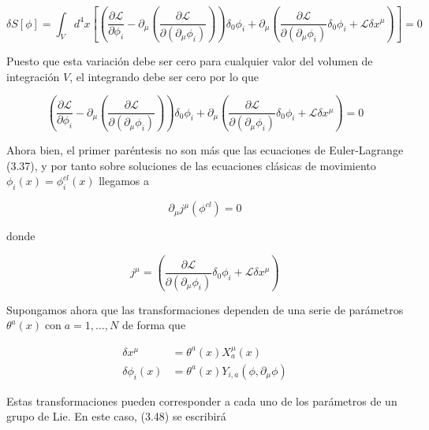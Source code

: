 \begin{equation*}
\delta S[\phi]=\int_{V} d^{4} x\left[\left(\frac{\partial \mathscr{L}}{\partial \phi_{i}}-\partial_{\mu}\left(\frac{\partial \mathscr{L}}{\partial\left(\partial_{\mu} \phi_{i}\right)}\right)\right) \delta_{0} \phi_{i}+\partial_{\mu}\left(\frac{\partial \mathscr{L}}{\partial\left(\partial_{\mu} \phi_{i}\right)} \delta_{0} \phi_{i}+\mathscr{L} \delta x^{\mu}\right)\right]=0 \tag{3.52}
\end{equation*}


Puesto que esta variación debe ser cero para cualquier valor del volumen de integración $V$, el integrando debe ser cero por lo que

\begin{equation*}
\left(\frac{\partial \mathscr{L}}{\partial \phi_{i}}-\partial_{\mu}\left(\frac{\partial \mathscr{L}}{\partial\left(\partial_{\mu} \phi_{i}\right)}\right)\right) \delta_{0} \phi_{i}+\partial_{\mu}\left(\frac{\partial \mathscr{L}}{\partial\left(\partial_{\mu} \phi_{i}\right)} \delta_{0} \phi_{i}+\mathscr{L} \delta x^{\mu}\right)=0 \tag{3.53}
\end{equation*}


Ahora bien, el primer paréntesis no son más que las ecuaciones de Euler-Lagrange (3.37), y por tanto sobre soluciones de las ecuaciones clásicas de movimiento $\phi_{i}(x)=\phi_{i}^{c l}(x)$ llegamos a

\begin{equation*}
\partial_{\mu} j^{\mu}\left(\phi^{c l}\right)=0 \tag{3.54}
\end{equation*}

donde

\begin{equation*}
j^{\mu}=\left(\frac{\partial \mathscr{L}}{\partial\left(\partial_{\mu} \phi_{i}\right)} \delta_{0} \phi_{i}+\mathscr{L} \delta x^{\mu}\right) \tag{3.55}
\end{equation*}


Supongamos ahora que las transformaciones dependen de una serie de parámetros $\theta^{a}(x) \operatorname{con} a=1, \ldots, N$ de forma que

\[\begin{aligned}
\delta x^{\mu} & =\theta^{a}(x) X_{a}^{\mu}(x) \\
\delta \phi_{i}(x) & =\theta^{a}(x) Y_{i, a}\left(\phi, \partial_{\mu} \phi\right) \tag{3.56}
\end{aligned}\]

Estas transformaciones pueden corresponder a cada uno de los parámetros de un grupo de Lie. En este caso, (3.48) se escribirá

